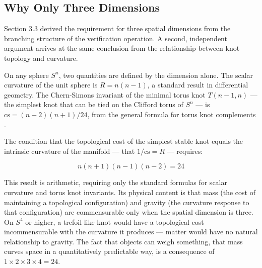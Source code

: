 


\subsection{Why Only Three Dimensions}

Section 3.3 derived the requirement for three spatial dimensions from the branching structure of the verification operation. A second, independent argument arrives at the same conclusion from the relationship between knot topology and curvature.

On any sphere $S^n$, two quantities are defined by the dimension alone. The scalar curvature of the unit sphere is $R = n(n-1)$, a standard result in differential geometry. The Chern-Simons invariant of the minimal torus knot $T(n-1,n)$ --- the simplest knot that can be tied on the Clifford torus of $S^n$ --- is $\mathrm{cs} = (n-2)(n+1)/24$, from the general formula for torus knot complements \cite{kirkklassen1993}.

The condition that the topological cost of the simplest stable knot equals the intrinsic curvature of the manifold --- that $1/\mathrm{cs} = R$ --- requires:

$$n(n+1)(n-1)(n-2) = 24$$

\begin{center}
\end{center}

\medskip
This result is arithmetic, requiring only the standard formulas for scalar curvature and torus knot invariants. Its physical content is that mass (the cost of maintaining a topological configuration) and gravity (the curvature response to that configuration) are commensurable only when the spatial dimension is three. On $S^4$ or higher, a trefoil-like knot would have a topological cost incommensurable with the curvature it produces --- matter would have no natural relationship to gravity. The fact that objects can weigh something, that mass curves space in a quantitatively predictable way, is a consequence of $1 \times 2 \times 3 \times 4 = 24$.


